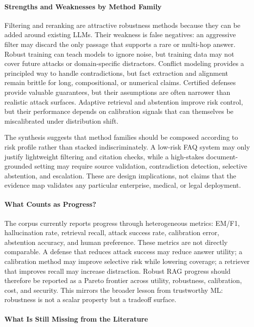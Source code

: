 \paragraph{Strengths and Weaknesses by Method Family}

Filtering and reranking are attractive robustness methods because they can be added around existing LLMs. Their weakness is false negatives: an aggressive filter may discard the only passage that supports a rare or multi-hop answer. Robust training can teach models to ignore noise, but training data may not cover future attacks or domain-specific distractors. Conflict modeling provides a principled way to handle contradictions, but fact extraction and alignment remain brittle for long, compositional, or numerical claims. Certified defenses provide valuable guarantees, but their assumptions are often narrower than realistic attack surfaces. Adaptive retrieval and abstention improve risk control, but their performance depends on calibration signals that can themselves be miscalibrated under distribution shift.

The synthesis suggests that method families should be composed according to risk profile rather than stacked indiscriminately. A low-risk FAQ system may only justify lightweight filtering and citation checks, while a high-stakes document-grounded setting may require source validation, contradiction detection, selective abstention, and escalation. These are design implications, not claims that the evidence map validates any particular enterprise, medical, or legal deployment.

\paragraph{What Counts as Progress?}

The corpus currently reports progress through heterogeneous metrics: EM/F1, hallucination rate, retrieval recall, attack success rate, calibration error, abstention accuracy, and human preference. These metrics are not directly comparable. A defense that reduces attack success may reduce answer utility; a calibration method may improve selective risk while lowering coverage; a retriever that improves recall may increase distraction. Robust RAG progress should therefore be reported as a Pareto frontier across utility, robustness, calibration, cost, and security. This mirrors the broader lesson from trustworthy ML: robustness is not a scalar property but a tradeoff surface.

\paragraph{What Is Still Missing from the Literature}

